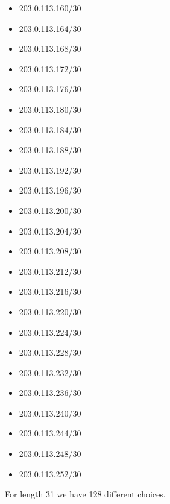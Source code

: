 \documentclass[a4paper,10pt]{article}
\begin{document}
\begin{itemize}
  \item 203.0.113.160/30
  \item 203.0.113.164/30
  \item 203.0.113.168/30
  \item 203.0.113.172/30
  \item 203.0.113.176/30
  \item 203.0.113.180/30
  \item 203.0.113.184/30
  \item 203.0.113.188/30
  \item 203.0.113.192/30
  \item 203.0.113.196/30
  \item 203.0.113.200/30
  \item 203.0.113.204/30
  \item 203.0.113.208/30
  \item 203.0.113.212/30
  \item 203.0.113.216/30
  \item 203.0.113.220/30
  \item 203.0.113.224/30
  \item 203.0.113.228/30
  \item 203.0.113.232/30
  \item 203.0.113.236/30
  \item 203.0.113.240/30
  \item 203.0.113.244/30
  \item 203.0.113.248/30
  \item 203.0.113.252/30
\end{itemize}
For length 31 we have 128 different choices.
\end{document}
